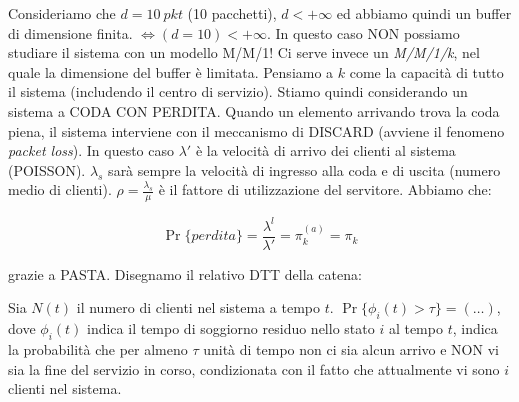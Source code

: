 \begin{itemize}
Consideriamo che $d = 10\ pkt$ (10 pacchetti), $d<+\infty$ ed abbiamo quindi un buffer di dimensione finita. $\iff (d=10)<+\infty$. In questo caso NON possiamo studiare il sistema con un modello M/M/1! Ci serve invece un \textit{M/M/1/k}, nel quale la dimensione del buffer è limitata. Pensiamo a $k$ come la capacità di tutto il sistema (includendo il centro di servizio). Stiamo quindi considerando un sistema a CODA CON PERDITA. Quando un elemento arrivando trova la coda piena, il sistema interviene con il meccanismo di DISCARD (avviene il fenomeno \textit{packet loss}). In questo caso $\lambda'$ è la velocità di arrivo dei clienti al sistema (POISSON). $\lambda_s$ sarà sempre la velocità di ingresso alla coda e di uscita (numero medio di clienti). $\rho=\frac{\lambda_s}{\mu}$ è il fattore di utilizzazione del servitore. Abbiamo che:

\[
	\Pr\{perdita\} = \frac{\lambda^l}{\lambda'} = \pi_k^{(a)} = \pi_k
\]

grazie a PASTA. Disegnamo il relativo DTT della catena:

\begin{center}
\end{center}

Sia $N(t)$ il numero di clienti nel sistema a tempo $t$. 
$\Pr\{\phi_i(t) > \tau\} = (\dots)$, dove $\phi_i(t)$ indica il tempo di soggiorno residuo nello stato $i$ al tempo $t$, indica la probabilità che per almeno $\tau$ unità di tempo non ci sia alcun arrivo e NON vi sia la fine del servizio in corso, condizionata con il fatto che attualmente vi sono $i$ clienti nel sistema.


\end{itemize}
